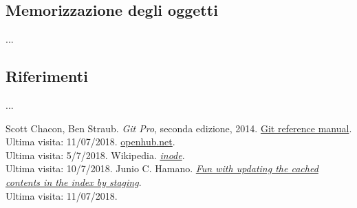 \documentclass[12pt]{article}
\begin{document}
\subsection{Memorizzazione degli oggetti}
...
\subsection{Riferimenti}
...
\newpage
\begin{thebibliography}{9}
	Scott Chacon, Ben Straub. \textit{Git Pro}, seconda edizione, 2014.
	\href{https://git-scm.com/docs}{Git reference manual}. \\Ultima visita: 11/07/2018.
	\url{openhub.net}. \\Ultima visita: 5/7/2018.
	Wikipedia. \href{https://en.wikipedia.org/wiki/Inode}{\textit{inode}}. \\Ultima visita: 10/7/2018.
	Junio C. Hamano. \href{https://gitster.livejournal.com/39629.html}{\textit{Fun with updating the cached contents in the index by staging}}. \\Ultima visita: 11/07/2018.
\end{thebibliography}
\end{document}
